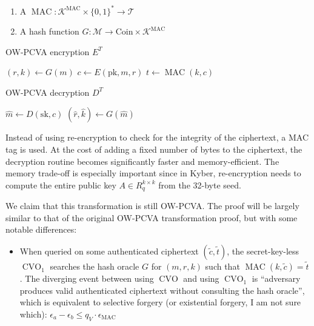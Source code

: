 \documentclass{article}
\begin{document}
\begin{enumerate}
    \item A $\operatorname{MAC}: \mathcal{K}^\text{MAC} \times \{0,1\}^\ast \rightarrow \mathcal{T}$
    \item A hash function $G: \mathcal{M} \rightarrow \text{Coin} \times \mathcal{K}^\text{MAC}$
\end{enumerate}

\begin{multicols}{2}
    \begin{algorithm}[H]
        \SetAlgoLined
        \caption{OW-PCVA encryption $E^T$}
        $(r, k) \leftarrow G(m)$\;
        $c \leftarrow E(\text{pk}, m, r)$\;
        $t \leftarrow \operatorname{MAC}(k, c)$
        \;
        \;
    \end{algorithm}

    \columnbreak

    \begin{algorithm}[H]
        \SetAlgoLined
        \caption{OW-PCVA decryption $D^T$}
        $\hat{m} \leftarrow D(\text{sk}, c)$\;
        $(\hat{r}, \hat{k}) \leftarrow G(\hat{m})$\;
        \;
    \end{algorithm}
\end{multicols}

Instead of using re-encryption to check for the integrity of the ciphertext, a MAC tag is used. At the cost of adding a fixed number of bytes to the ciphertext, the decryption routine becomes significantly faster and memory-efficient. The memory trade-off is especially important since in Kyber, re-encryption needs to compute the entire public key $A \in R_q^{k \times k}$ from the 32-byte seed.

We claim that this transformation is still OW-PCVA. The proof will be largely similar to that of the original OW-PCVA transformation proof, but with some notable differences:

\begin{itemize}
    \item When queried on some authenticated ciphertext $(\tilde{c}, \tilde{t})$, the secret-key-less $\operatorname{CVO}_1$ searches the hash oracle $G$ for $(m, r, k)$ such that $\operatorname{MAC}(k, \tilde{c}) = \tilde{t}$. The diverging event between using $\operatorname{CVO}$ and using $\operatorname{CVO}_1$ is ``adversary produces valid authenticated ciphertext without consulting the hash oracle'', which is equivalent to selective forgery (or existential forgery, I am not sure which): $\epsilon_a - \epsilon_b \leq q_V \cdot \epsilon_\text{MAC}$
\end{itemize}
\end{document}
